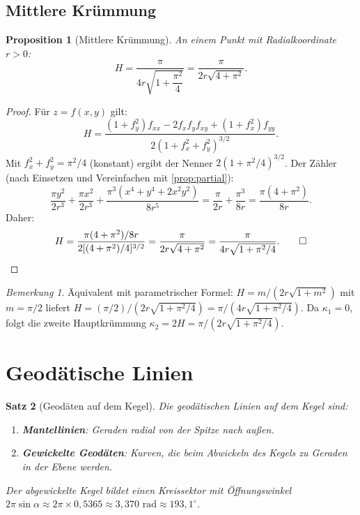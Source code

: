\documentclass[12pt,a4paper]{article}
\theoremstyle{plain}
\newtheorem{satz}{Satz}[section]
\newtheorem{proposition}[satz]{Proposition}
\theoremstyle{definition}
\theoremstyle{remark}
\newtheorem{bemerkung}{Bemerkung}[section]
\begin{document}
\subsection{Mittlere Kr\"{u}mmung}

\begin{proposition}[Mittlere Kr\"{u}mmung]\label{prop:mittlere}
An einem Punkt mit Radialkoordinate $r>0$:
\begin{equation}\label{eq:mittlere}
H = \frac{\pi}{4r\sqrt{1+\dfrac{\pi^2}{4}}} = \frac{\pi}{2r\sqrt{4+\pi^2}}.
\end{equation}
\end{proposition}

\begin{proof}
F\"{u}r $z = f(x,y)$ gilt:
\[
H = \frac{(1+f_y^2)f_{xx} - 2f_xf_yf_{xy} + (1+f_x^2)f_{yy}}{2(1+f_x^2+f_y^2)^{3/2}}.
\]
Mit $f_x^2+f_y^2 = \pi^2/4$ (konstant) ergibt der Nenner $2(1+\pi^2/4)^{3/2}$.
Der Z\"{a}hler (nach Einsetzen und Vereinfachen mit \cref{prop:partial}):
\[
\frac{\pi y^2}{2r^3}+\frac{\pi x^2}{2r^3}
+\frac{\pi^3(x^4+y^4+2x^2y^2)}{8r^5}
= \frac{\pi}{2r}+\frac{\pi^3}{8r}
= \frac{\pi(4+\pi^2)}{8r}.
\]
Daher:
\[
H = \frac{\pi(4+\pi^2)/8r}{2[(4+\pi^2)/4]^{3/2}}
= \frac{\pi}{2r\sqrt{4+\pi^2}} = \frac{\pi}{4r\sqrt{1+\pi^2/4}}.\qed
\]
\end{proof}

\begin{bemerkung}
\"{A}quivalent mit parametrischer Formel: $H = m/(2r\sqrt{1+m^2})$ mit $m=\pi/2$
liefert $H = (\pi/2)/(2r\sqrt{1+\pi^2/4}) = \pi/(4r\sqrt{1+\pi^2/4})$.
Da $\kappa_1=0$, folgt die zweite Hauptkr\"{u}mmung
$\kappa_2 = 2H = \pi/(2r\sqrt{1+\pi^2/4})$.
\end{bemerkung}

\section{Geod\"{a}tische Linien}

\begin{satz}[Geod\"{a}ten auf dem Kegel]
Die geod\"{a}tischen Linien auf dem Kegel sind:
\begin{enumerate}
\item \textbf{Mantellinien}: Geraden radial von der Spitze nach au\ss en.
\item \textbf{Gewickelte Geod\"{a}ten}: Kurven, die beim Abwickeln des Kegels zu
Geraden in der Ebene werden.
\end{enumerate}
Der abgewickelte Kegel bildet einen Kreissektor mit \"{O}ffnungswinkel
$2\pi\sin\alpha \approx 2\pi\times 0{,}5365 \approx 3{,}370\text{ rad} \approx 193{,}1^\circ$.
\end{satz}
\end{document}

